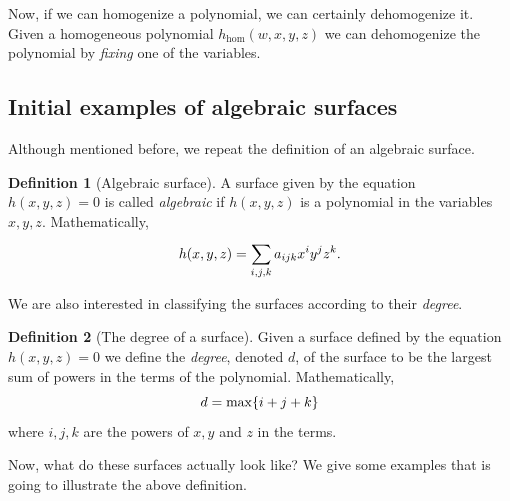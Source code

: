 \documentclass[a4paper]{article}
\theoremstyle{definition}
\newtheorem{defn}{Definition}
\theoremstyle{plain}
\renewcommand{\hom}{\ensuremath{h_{\mathrm{hom}}}}
\begin{document}
    Now, if we can homogenize a polynomial, we can certainly dehomogenize it.
    Given a homogeneous polynomial $\hom(w, x, y, z)$ we can dehomogenize the
    polynomial by \emph{fixing} one of the variables.

    \subsection{Initial examples of algebraic surfaces}
    \label{sub:initial_examples_of_algebraic_surfaces}
    
    Although mentioned before, we repeat the definition of an algebraic surface.
    \begin{defn}[Algebraic surface]
        A surface given by the equation $h(x, y, z) = 0$ is called \emph{algebraic}
        if $h(x, y, z)$ is a polynomial in the variables $x, y, z$.
        Mathematically,
        \begin{equation}
            \notag
            h(x, y, z) = \sum^{}_{i, j, k} a_{ijk}x^iy^jz^k.
        \end{equation}
    \end{defn}     

    We are also interested in classifying the surfaces according to their
    \emph{degree}. 
    \begin{defn}[The degree of a surface]
        Given a surface defined by the equation $h(x, y, z) = 0$ we define the
        \emph{degree}, denoted $d$, of the surface to be the largest sum of
        powers in the terms of the polynomial. Mathematically,
        \begin{equation}
            \notag
            d = \max\{i + j + k\}
        \end{equation}
        where $i, j, k$ are the powers of $x, y$ and $z$ in the terms.
    \end{defn}
    Now, what do these surfaces actually look like? We give some examples that
    is going to illustrate the above definition.
    
\end{document}

